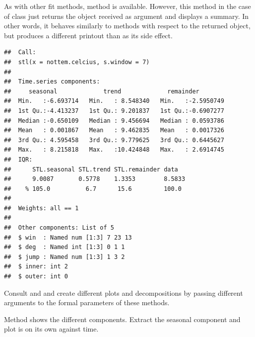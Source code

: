 \documentclass[krantz2]{krantz}\usepackage{knitr}
\begin{document}
As with other fit methods, method  is available. However, this method in the case of class  just returns the  object received as argument and displays a summary. In other words, it behaves similarly to  methods with respect to the returned object, but produces a different printout than  as its side effect.

\begin{knitrout}\footnotesize
{}\color{fgcolor}\begin{kframe}
\begin{alltt}
\end{alltt}
\begin{verbatim}
##  Call:
##  stl(x = nottem.celcius, s.window = 7)
## 
##  Time.series components:
##     seasonal             trend             remainder         
##  Min.   :-6.693714   Min.   : 8.548340   Min.   :-2.5950749  
##  1st Qu.:-4.413237   1st Qu.: 9.201837   1st Qu.:-0.6907277  
##  Median :-0.650109   Median : 9.456694   Median : 0.0593786  
##  Mean   : 0.001867   Mean   : 9.462835   Mean   : 0.0017326  
##  3rd Qu.: 4.595458   3rd Qu.: 9.779625   3rd Qu.: 0.6445627  
##  Max.   : 8.215818   Max.   :10.424848   Max.   : 2.6914745  
##  IQR:
##      STL.seasonal STL.trend STL.remainder data  
##      9.0087       0.5778    1.3353        8.5833
##    % 105.0          6.7      15.6         100.0 
## 
##  Weights: all == 1
## 
##  Other components: List of 5
##  $ win  : Named num [1:3] 7 23 13
##  $ deg  : Named int [1:3] 0 1 1
##  $ jump : Named num [1:3] 1 3 2
##  $ inner: int 2
##  $ outer: int 0
\end{verbatim}
\end{kframe}
\end{knitrout}

\begin{playground}
Consult  and  and create different plots and decompositions by passing different arguments to the formal parameters of these methods.

Method  shows the different components. Extract the seasonal component and plot is on its own against time.

\begin{knitrout}\footnotesize
{}\color{fgcolor}\begin{kframe}
\begin{alltt}
\end{alltt}
\end{kframe}
\end{knitrout}

\end{playground}
\end{document}
